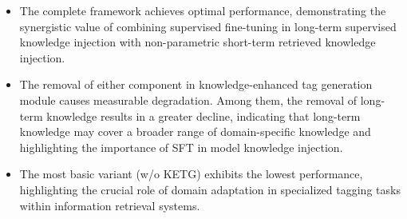\begin{itemize}[leftmargin = 12 pt]
\item The complete framework achieves optimal performance, demonstrating the synergistic value of combining supervised fine-tuning in long-term supervised knowledge injection with non-parametric short-term retrieved knowledge injection.
\item The removal of either component in knowledge-enhanced tag generation module causes measurable degradation.
Among them, the removal of long-term knowledge results in a greater decline, indicating that long-term knowledge may cover a broader range of domain-specific knowledge and highlighting the importance of SFT in model knowledge injection.

\item The most basic variant (w/o KETG) exhibits the lowest performance, highlighting the crucial role of domain adaptation in specialized tagging tasks within information retrieval systems.
\end{itemize}






